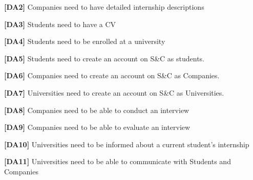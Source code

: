 \textbf{[DA2]} Companies need to have detailed internship descriptions

\textbf{[DA3]} Students need to have a CV

\textbf{[DA4]} Students need to be enrolled at a university 

\textbf{[DA5]} Students need to create an account on S\&C as students.

\textbf{[DA6]} Companies need to create an account on S\&C as Companies.

\textbf{[DA7]} Universities need to create an account on S\&C as Universities.

\textbf{[DA8]} Companies need to be able to conduct an interview

\textbf{[DA9]} Companies need to be able to evaluate an interview

\textbf{[DA10]} Universities need to be informed about a current student's internship

\textbf{[DA11]} Universities need to be able to communicate with Students and Companies
